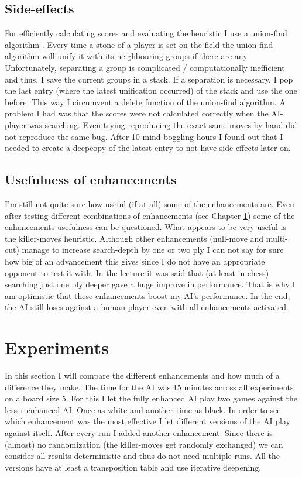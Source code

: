 \documentclass[a4paper]{article}
\begin{document}
\subsection{Side-effects}
For efficiently calculating scores and evaluating the heuristic I use a union-find algorithm \cite{galler1964improved}. Every time a stone of a player is set on the field the union-find algorithm will unify it with its neighbouring groups if there are any. Unfortunately, separating a group is complicated / computationally inefficient and thus, I save the current groups in a stack. If a separation is necessary, I pop the last entry (where the latest unification occurred) of the stack and use the one before. This way I circumvent a delete function of the union-find algorithm.
A problem I had was that the scores were not calculated correctly when the AI-player was searching. Even trying reproducing the exact same moves by hand did not reproduce the same bug. After 10 mind-boggling hours I found out that I needed to create a deepcopy of the latest entry to not have side-effects later on.

\subsection{Usefulness of enhancements}
I'm still not quite sure how useful (if at all) some of the enhancements are. Even after testing different combinations of enhancements (see Chapter \ref{experiments}) some of the enhancements usefulness can be questioned. What appears to be very useful is the killer-moves heuristic. Although other enhancements (null-move and multi-cut) manage to increase search-depth by one or two ply I can not say for sure how big of an advancement this gives since I do not have an appropriate opponent to test it with. In the lecture it was said that (at least in chess) searching just one ply deeper gave a huge improve in performance. That is why I am optimistic that these enhancements boost my AI's performance. In the end, the AI still loses against a human player even with all enhancements activated.

\section{Experiments}\label{experiments}
In this section I will compare the different enhancements and how much of a difference they make. The time for the AI was 15 minutes across all experiments on a board size 5. For this I let the fully enhanced AI play two games against the lesser enhanced AI. Once as white and another time as black.
In order to see which enhancement was the most effective I let different versions of the AI play against itself. After every run I added another enhancement. Since there is (almost) no randomization (the killer-moves get randomly exchanged) we can consider all results deterministic and thus do not need multiple runs. All the versions have at least a transposition table and use iterative deepening.
\end{document}

